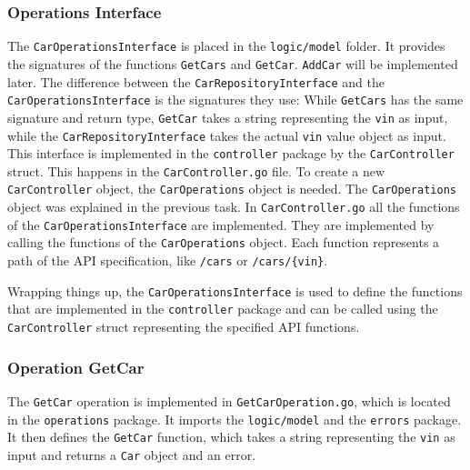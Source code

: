 \subsubsection*{Operations Interface}
\label{sec:operationsInterface}
The \texttt{CarOperationsInterface} is placed in the \texttt{logic/model} folder.
It provides the signatures of the functions \texttt{GetCars} and \texttt{GetCar}.
\texttt{AddCar} will be implemented later.
The difference between the \texttt{CarRepositoryInterface} and the \texttt{CarOperationsInterface} is the signatures they use:
While \texttt{GetCars} has the same signature and return type, \texttt{GetCar} takes a string representing the \texttt{vin} as input, while the \texttt{CarRepositoryInterface} takes the actual \texttt{vin} value object as input.
This interface is implemented in the \texttt{controller} package by the \texttt{CarController} struct.
This happens in the \texttt{CarController.go} file.
To create a new \texttt{CarController} object, the \texttt{CarOperations} object is needed.
The \texttt{CarOperations} object was explained in the previous task.
In \texttt{CarController.go} all the functions of the \texttt{CarOperationsInterface} are implemented.
They are implemented by calling the functions of the \texttt{CarOperations} object.
Each function represents a path of the API specification, like \texttt{/cars} or \texttt{/cars/\{vin\}}.

Wrapping things up, the \texttt{CarOperationsInterface} is used to define the functions that are implemented in the \texttt{controller} package and can be called using the \texttt{CarController} struct representing the specified API functions.

\subsubsection*{Operation GetCar}
The \texttt{GetCar} operation is implemented in \texttt{GetCarOperation.go}, which is located in the \texttt{operations} package.
It imports the \texttt{logic/model} and the \texttt{errors} package.
It then defines the \texttt{GetCar} function, which takes a string representing the \texttt{vin} as input and returns a \texttt{Car} object and an error.

